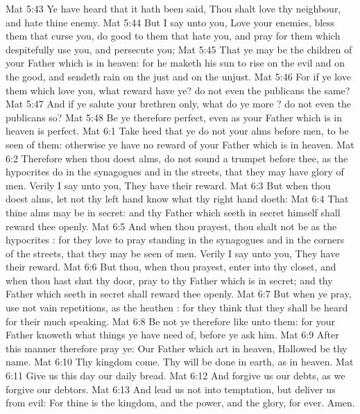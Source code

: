 \vs Mat 5:43 Ye have heard that it hath been said, Thou shalt love thy neighbour, and hate thine enemy.
\vs Mat 5:44 But I say unto you, Love your enemies, bless them that curse you, do good to them that hate you, and pray for them which despitefully use you, and persecute you;
\vs Mat 5:45 That ye may be the children of your Father which is in heaven: for he maketh his sun to rise on the evil and on the good, and sendeth rain on the just and on the unjust.
\vs Mat 5:46 For if ye love them which love you, what reward have ye? do not even the publicans the same?
\vs Mat 5:47 And if ye salute your brethren only, what do ye more ? do not even the publicans so?
\vs Mat 5:48 Be ye therefore perfect, even as your Father which is in heaven is perfect.
\vs Mat 6:1 Take heed that ye do not your alms before men, to be seen of them: otherwise ye have no reward of your Father which is in heaven.
\vs Mat 6:2 Therefore when thou doest  alms, do not sound a trumpet before thee, as the hypocrites do in the synagogues and in the streets, that they may have glory of men. Verily I say unto you, They have their reward.
\vs Mat 6:3 But when thou doest alms, let not thy left hand know what thy right hand doeth:
\vs Mat 6:4 That thine alms may be in secret: and thy Father which seeth in secret himself shall reward thee openly.
\vs Mat 6:5 And when thou prayest, thou shalt not be as the hypocrites : for they love to pray standing in the synagogues and in the corners of the streets, that they may be seen of men. Verily I say unto you, They have their reward.
\vs Mat 6:6 But thou, when thou prayest, enter into thy closet, and when thou hast shut thy door, pray to thy Father which is in secret; and thy Father which seeth in secret shall reward thee openly.
\vs Mat 6:7 But when ye pray, use not vain repetitions, as the heathen : for they think that they shall be heard for their much speaking.
\vs Mat 6:8 Be not ye therefore like unto them: for your Father knoweth what things ye have need of, before ye ask him.
\vs Mat 6:9 After this manner therefore pray ye: Our Father which art in heaven, Hallowed be thy name.
\vs Mat 6:10 Thy kingdom come. Thy will be done in earth, as  in heaven.
\vs Mat 6:11 Give us this day our daily bread.
\vs Mat 6:12 And forgive us our debts, as we forgive our debtors.
\vs Mat 6:13 And lead us not into temptation, but deliver us from evil: For thine is the kingdom, and the power, and the glory, for ever. Amen.
